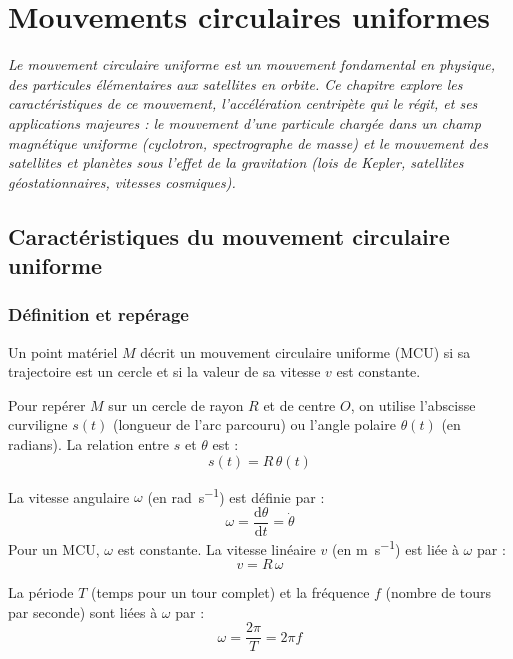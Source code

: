 \chapter{Mouvements circulaires uniformes}

\textit{Le mouvement circulaire uniforme est un mouvement fondamental en physique, des particules élémentaires aux satellites en orbite. Ce chapitre explore les caractéristiques de ce mouvement, l'accélération centripète qui le régit, et ses applications majeures : le mouvement d'une particule chargée dans un champ magnétique uniforme (cyclotron, spectrographe de masse) et le mouvement des satellites et planètes sous l'effet de la gravitation (lois de Kepler, satellites géostationnaires, vitesses cosmiques).}

\section{Caractéristiques du mouvement circulaire uniforme}

\subsection{Définition et repérage}

\begin{definition}
Un point matériel $M$ décrit un mouvement circulaire uniforme (MCU) si sa trajectoire est un cercle et si la valeur de sa vitesse $v$ est constante.
\end{definition}

Pour repérer $M$ sur un cercle de rayon $R$ et de centre $O$, on utilise l'abscisse curviligne $s(t)$ (longueur de l'arc parcouru) ou l'angle polaire $\theta(t)$ (en radians). La relation entre $s$ et $\theta$ est :
\[
s(t) = R\,\theta(t)
\]

\begin{propriete}
La vitesse angulaire $\omega$ (en \si{\radian\per\second}) est définie par :
\[
\omega = \frac{\mathrm{d}\theta}{\mathrm{d}t} = \dot{\theta}
\]
Pour un MCU, $\omega$ est constante. La vitesse linéaire $v$ (en \si{\metre\per\second}) est liée à $\omega$ par :
\[
v = R\,\omega
\]
\end{propriete}

\begin{remarque}
La période $T$ (temps pour un tour complet) et la fréquence $f$ (nombre de tours par seconde) sont liées à $\omega$ par :
\[
\omega = \frac{2\pi}{T} = 2\pi f
\]
\end{remarque}

